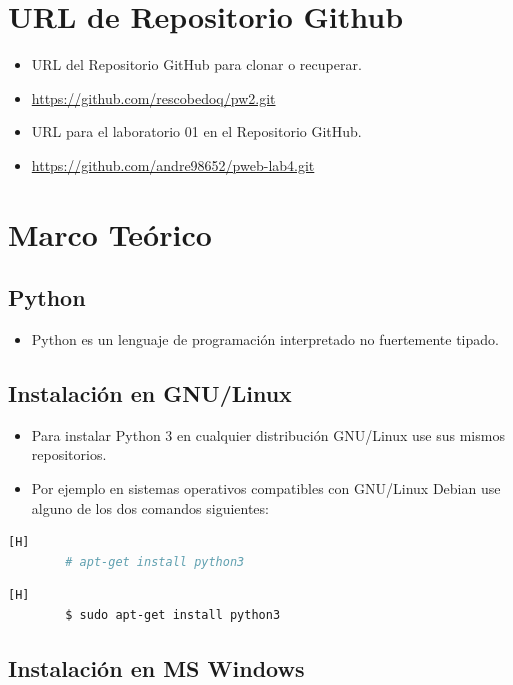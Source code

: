 \documentclass{article}
\begin{document}
	\section{URL de Repositorio Github}
	\begin{itemize}
		\item URL del Repositorio GitHub para clonar o recuperar.
		\item \url{https://github.com/rescobedoq/pw2.git}
		\item URL para el laboratorio 01 en el Repositorio GitHub.
		\item \url{https://github.com/andre98652/pweb-lab4.git}
	\end{itemize}
	
	\section{Marco Teórico}
	
	\subsection{Python}
	\begin{itemize}	
		\item Python es un lenguaje de programación interpretado no fuertemente tipado.
		
	\end{itemize}	
	\subsection{Instalación en GNU/Linux}
	\begin{itemize}	
		\item Para instalar Python 3 en cualquier distribución GNU/Linux use sus mismos repositorios.
		\item Por ejemplo en sistemas operativos compatibles con GNU/Linux Debian use alguno de los dos comandos siguientes:
	\end{itemize}	
	\begin{lstlisting}[language=bash,caption={Instalar Python en GNU/Linux Debian}][H]
		# apt-get install python3
	\end{lstlisting}
	\begin{lstlisting}[language=bash,caption={Instalar Python en GNU/Linux Ubuntu}][H]
		$ sudo apt-get install python3
	\end{lstlisting}	
	
	
	\subsection{Instalación en MS Windows}
	
\end{document}
